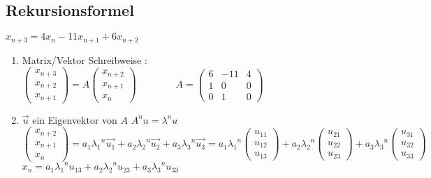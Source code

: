 	\subsection{Rekursionsformel}
		$x_{n+3} = 4x_n - 11x_{n+1} + 6x_{n+2}$\\
		\begin{enumerate}
			\item Matrix/Vektor Schreibweise : $\left(\begin{array}{c}
					x_{n+3}\\
					x_{n+2}\\
					x_{n+1}
				\end{array}\right) = A\left(\begin{array}{c}
					x_{n+2}\\
					x_{n+1}\\
					x_n
				\end{array}\right) \qquad \qquad A = \left(\begin{array}{ccc}
					6 & -11 & 4\\
					1 & 0 & 0\\
					0 & 1 & 0
				\end{array}\right)$

			\item $\vec{u}$ ein Eigenvektor von $A$ \qquad $A^nu = \lambda^nu$ \\
				$\left(\begin{array}{c}
					x_{n+2}\\
					x_{n+1}\\
					x_n
				\end{array}\right) = 
				a_1{\lambda_1}^n\vec{u_1}+a_2{\lambda_2}^n\vec{u_2}+ a_3{\lambda_3}^n\vec{u_3} =
				a_1{\lambda_1}^n\left(\begin{array}{c}
					u_{11}\\
					u_{12}\\
					u_{13}
				\end{array}\right) + a_2{\lambda_2}^n\left(\begin{array}{c}
					u_{21}\\
					u_{22}\\
					u_{23}
				\end{array}\right) + a_3{\lambda_3}^n\left(\begin{array}{c}
					u_{31}\\
					u_{32}\\
					u_{33}
				\end{array}\right)$ \\
				$x_n = a_1{\lambda_1}^nu_{13} + a_2{\lambda_2}^nu_{23} + a_3{\lambda_3}^nu_{33}$
		\end{enumerate}


































